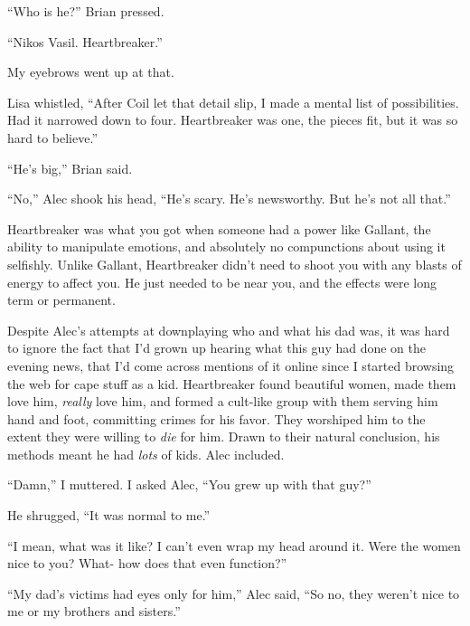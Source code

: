 ``Who is he?'' Brian pressed.



``Nikos Vasil.  Heartbreaker.''



My eyebrows went up at that.



Lisa whistled, ``After Coil let that detail slip, I made a mental list of possibilities.  Had it narrowed down to four.  Heartbreaker was one, the pieces fit, but it was so hard to believe.''



``He's big,'' Brian said.



``No,'' Alec shook his head, ``He's scary.  He's newsworthy.  But he's not all that.''



Heartbreaker was what you got when someone had a power like Gallant, the ability to manipulate emotions, and absolutely no compunctions about using it selfishly.  Unlike Gallant, Heartbreaker didn't need to shoot you with any blasts of energy to affect you.  He just needed to be near you, and the effects were long term or permanent.



Despite Alec's attempts at downplaying who and what his dad was, it was hard to ignore the fact that I'd grown up hearing what this guy had done on the evening news, that I'd come across mentions of it online since I started browsing the web for cape stuff as a kid.  Heartbreaker found beautiful women, made them love him, \emph{really} love him, and formed a cult-like group with them serving him hand and foot, committing crimes for his favor.  They worshiped him to the extent they were willing to \emph{die} for him.  Drawn to their natural conclusion, his methods meant he had \emph{lots} of kids.  Alec included.



``Damn,'' I muttered.  I asked Alec, ``You grew up with that guy?''



He shrugged, ``It was normal to me.''



``I mean, what was it like? I can't even wrap my head around it.  Were the women nice to you?  What- how does that even function?''



``My dad's victims had eyes only for him,'' Alec said, ``So no, they weren't nice to me or my brothers and sisters.''



